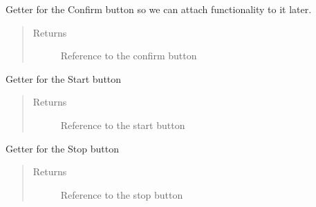 \documentclass[letterpaper,10pt,english]{sphinxmanual}
\begin{document}
\begin{fulllineitems}
\begin{fulllineitems}
\begin{quote}
\begin{description}
\end{description}\end{quote}

\end{fulllineitems}


\begin{fulllineitems}
\label{\detokenize{index:src.Views.View_TrackingScreen.TrackingWindow.BtnConfirm}}
Getter for the Confirm button so we can attach functionality to it later.
\begin{quote}\begin{description}
\item[{Returns}] \leavevmode
Reference to the confirm button

\end{description}\end{quote}

\end{fulllineitems}


\begin{fulllineitems}
\label{\detokenize{index:src.Views.View_TrackingScreen.TrackingWindow.BtnStart}}
Getter for the Start button
\begin{quote}\begin{description}
\item[{Returns}] \leavevmode
Reference to the start button

\end{description}\end{quote}

\end{fulllineitems}


\begin{fulllineitems}
\label{\detokenize{index:src.Views.View_TrackingScreen.TrackingWindow.BtnStop}}
Getter for the Stop button
\begin{quote}\begin{description}
\item[{Returns}] \leavevmode
Reference to the stop button


\end{description}
\end{quote}
\end{fulllineitems}
\end{fulllineitems}
\end{document}
